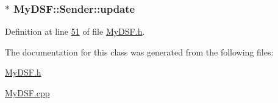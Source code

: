 \subsubsection[{update}]{$\ast$ My\+D\+S\+F\+::\+Sender\+::update}\label{class_my_d_s_f_1_1_sender_a15eb7f6b4e8124216e7fd29369543095}


Definition at line \hyperlink{_my_d_s_f_8h_source_l00051}{51} of file \hyperlink{_my_d_s_f_8h_source}{My\+D\+S\+F.\+h}.



The documentation for this class was generated from the following files\+:\begin{DoxyCompactItemize}
\item 
\hyperlink{_my_d_s_f_8h}{My\+D\+S\+F.\+h}\item 
\hyperlink{_my_d_s_f_8cpp}{My\+D\+S\+F.\+cpp}\end{DoxyCompactItemize}

